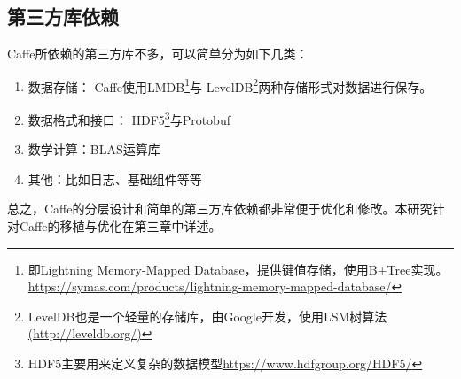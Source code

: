 \subsection{第三方库依赖}
Caffe所依赖的第三方库不多，可以简单分为如下几类：
\begin{enumerate}
\item 数据存储：
Caffe使用LMDB\footnote{即Lightning Memory-Mapped Database，提供键值存储，使用B+Tree实现。\url{https://symas.com/products/lightning-memory-mapped-database/}}与
LevelDB\footnote{LevelDB也是一个轻量的存储库，由Google开发，使用LSM树算法\url{(http://leveldb.org/)}}两种存储形式对数据进行保存。
\item 数据格式和接口：
HDF5\footnote{HDF5主要用来定义复杂的数据模型\url{https://www.hdfgroup.org/HDF5/}}与Protobuf
\item 数学计算：BLAS运算库
\item 其他：比如日志、基础组件等等
\end{enumerate}

总之，Caffe的分层设计和简单的第三方库依赖都非常便于优化和修改。本研究针对Caffe的移植与优化在第三章中详述。


